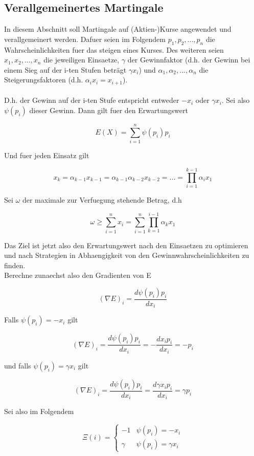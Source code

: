 \documentclass[11pt]{scrartcl}
\begin{document}
		\subsection{Verallgemeinertes Martingale}
			In diesem Abschnitt soll Martingale auf (Aktien-)Kurse angewendet und verallgemeinert werden. Dafuer seien im Folgendem \(p_{1}, p_{2}, ...,p_{n}\) die Wahrscheinlichkeiten fuer das steigen eines Kurses. Des weiteren seien \(x_{1}, x_{2}, ...,x_{n}\) die jeweiligen Einsaetze, \(\gamma\) der Gewinnfaktor (d.h. der Gewinn bei einem Sieg auf der i-ten Stufen beträgt \(\gamma x_{i}\)) und \(\alpha_{1}, \alpha_{2}, ...,\alpha_{n}\) die Steigerungsfaktoren (d.h. \(\alpha_{i}x_{i}=x_{i+1}\)).\\\\
			D.h. der Gewinn auf der i-ten Stufe entspricht entweder \(-x_{i}\) oder \(\gamma x_{i}\). Sei also \(\psi(p_{i})\) dieser Gewinn. Dann gilt fuer den Erwartungswert
			\begin{center}
				\[E(X)=\sum_{i=1}^n \psi(p_{i})p_{i}\]
			\end{center}
			Und fuer jeden Einsatz gilt
			\begin{center}
				\[x_{k}=\alpha_{k-1}x_{k-1}=\alpha_{k-1}\alpha_{k-2}x_{k-2}=...=\prod_{i=1}^{k-1}\alpha_{i}x_{1}\]
			\end{center}
			Sei \(\omega\) der maximale zur Verfuegung stehende Betrag, d.h
			\begin{center}
				\[\omega \geq \sum_{i=1}^{n}x_{i}=\sum_{i=1}^{n}\prod_{k=1}^{i-1}\alpha_{k}x_{1}\]
			\end{center}
			Das Ziel ist jetzt also den Erwartungswert nach den Einsaetzen zu optimieren und nach Strategien in Abhaengigkeit von den Gewinnwahrscheinlichkeiten zu finden.\\
			Berechne zunaechst also den Gradienten von E
			\begin{center}
				\[(\nabla E)_{i}=\frac{d\psi(p_{i})p_{i}}{dx_{i}}\]
			\end{center}
			Falls \(\psi(p_{i})=-x_{i}\) gilt
			\begin{center}
				\[(\nabla E)_{i}=\frac{d\psi(p_{i})p_{i}}{dx_{i}}=-\frac{dx_{i}p_{i}}{dx_{i}}=-p_{i}\]
			\end{center}
			und falls \(\psi(p_{i})=\gamma x_{i}\) gilt
			\begin{center}
				\[(\nabla E)_{i}=\frac{d\psi(p_{i})p_{i}}{dx_{i}}=\frac{d\gamma x_{i}p_{i}}{dx_{i}}=\gamma p_{i}\]
			\end{center}
			Sei also im Folgendem
			\begin{center}
				\[ \Xi(i) =
					\begin{cases}
						-1 & \psi(p_{i})=-x_{i} \\
						\gamma & \psi(p_{i})=\gamma x_{i}
					\end{cases}
				\]
			\end{center}
\end{document}
